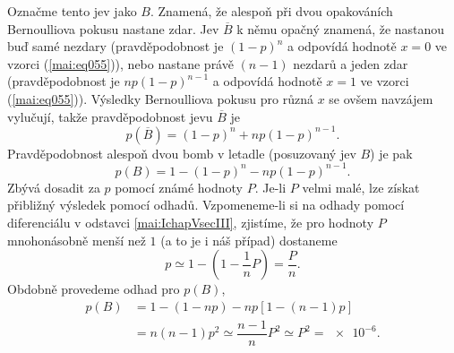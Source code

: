 \begin{mdframed}[style=mdexam]
\begin{example}
    Označme tento jev jako \(B\). Znamená, že alespoň při dvou opakováních Bernoulliova pokusu
    nastane zdar. Jev \(\overline{B}\) k němu opačný znamená, že nastanou buď samé nezdary
    (pravděpodobnost je \((1 - p)^n\) a odpovídá hodnotě \(x = 0\) ve vzorci (\ref{mai:eq055})),
    nebo nastane právě \((n - 1)\) nezdarů a jeden zdar (pravděpodobnost je \(np(1 - p)^{n-1}\) a
    odpovídá hodnotě \(x = 1\) ve vzorci (\ref{mai:eq055})). Výsledky Bernoulliova pokusu pro různá
    \(x\) se ovšem navzájem vylučují, takže pravděpodobnost jevu \(\overline{B}\) je
    \begin{equation*}
      \boxed{p(\overline{B}) = (1 - p)^n + np(1 - p)^{n-1}}.
    \end{equation*}
    Pravděpodobnost alespoň dvou bomb v letadle (posuzovaný jev \(B\)) je pak
    \begin{equation*}
      p(B) = 1 - (1 - p)^n - np(1 - p)^{n-1}.
    \end{equation*}
    Zbývá dosadit za \(p\) pomocí známé hodnoty \(P\). Je-li \(P\) velmi malé, lze získat přibližný
    výsledek pomocí odhadů. Vzpomeneme-li si na odhady pomocí diferenciálu v odstavci
    \ref{mai:IchapVsecIII}, zjistíme, že pro hodnoty \(P\) mnohonásobně menší než \(1\) (a to je i
    náš případ) dostaneme
    \begin{equation*}
      p \simeq 1 - \left(1 - \dfrac{1}{n}P\right) = \dfrac{P}{n}.
    \end{equation*}
    Obdobně provedeme odhad pro \(p(B)\),
    \begin{align*}
      p(B) &= 1 - (1 - np) - np\left[1 - (n - 1)p\right]     \\
           &= n(n - 1)p^2\simeq \dfrac{n-1}{n}P^2\simeq P^2 = \num{e-6}.
    \end{align*}
  \end{example}
\end{mdframed}